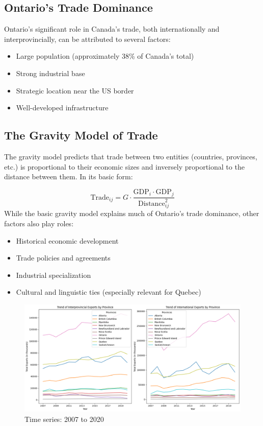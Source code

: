 \documentclass[12pt]{article}
\begin{document}
\subsection*{Ontario's Trade Dominance}
Ontario's significant role in Canada's trade, both internationally and interprovincially, can be attributed to several factors:
\begin{itemize}
    \item Large population (approximately 38\% of Canada's total)
    \item Strong industrial base
    \item Strategic location near the US border
    \item Well-developed infrastructure
\end{itemize}

\subsection*{The Gravity Model of Trade}
The gravity model predicts that trade between two entities (countries, provinces, etc.) is proportional to their economic sizes and inversely proportional to the distance between them. In its basic form:

\begin{equation}
    \text{Trade}_{ij} = G \cdot \frac{\text{GDP}_i \cdot \text{GDP}_j}{\text{Distance}_{ij}^2}
\end{equation}
While the basic gravity model explains much of Ontario's trade dominance, other factors also play roles:
\begin{itemize}
    \item Historical economic development
    \item Trade policies and agreements
    \item Industrial specialization
    \item Cultural and linguistic ties (especially relevant for Quebec)
\end{itemize}
\begin{figure}
    \centering
    \includegraphics[width=1\linewidth]{timeseries.png}
    \caption{Time series: 2007 to 2020}
    \label{fig:enter-label}
\end{figure}
\end{document}
